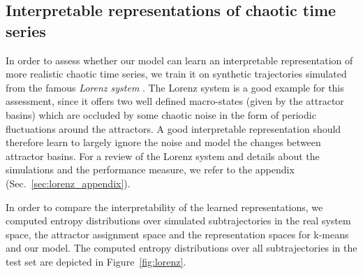 \documentclass{article}
\begin{document}
\subsection{Interpretable representations of chaotic time series} \label{sec:lorenz}

In order to assess whether our model can learn an interpretable representation of more realistic chaotic time series, we train it on synthetic trajectories simulated from the famous \emph{Lorenz system} \citep{Lorenz1963}.
The Lorenz system is a good example for this assessment, since it offers two well defined macro-states (given by the attractor basins) which are occluded by some chaotic noise in the form of periodic fluctuations around the attractors.
A good interpretable representation should therefore learn to largely ignore the noise and model the changes between attractor basins.
For a review of the Lorenz system and details about the simulations and the performance measure, we refer to the appendix (Sec.~\ref{sec:lorenz_appendix}).

In order to compare the interpretability of the learned representations, we computed entropy distributions over simulated subtrajectories in the real system space, the attractor assignment space and the representation spaces for k-means and our model.
The computed entropy distributions over all subtrajectories in the test set are depicted in Figure~\ref{fig:lorenz}. 
\end{document}
